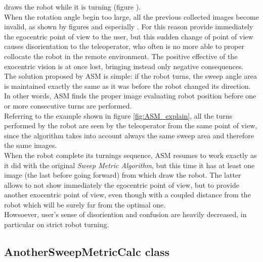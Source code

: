 \framework{} draws the robot while it is turning (figure
).
\\
When the rotation angle begin too large, all the previous collected images
become invalid, as shown by figures  and
especially . For this reason \framework{} provide
immediately the egocentric point of view to the user, but this sudden change
of point of view causes disorientation to the teleoperator, who often is
no more able to proper collocate the robot in the remote environment. The
positive effective of the exocentric vision is at once lost, bringing
instead only negative consequences.
\\
The solution proposed by ASM is simple: if the robot turns, the sweep angle
area is maintained exactly the same as it was before the robot changed
its direction. In other words, ASM finds the proper image evaluating robot
position before one or more consecutive turns are performed.
\\
Referring to the example shown in figure \ref{fig:ASM_explain}, all the
turns performed by the robot are seen by the teleoperator from the same
point of view, since the algorithm takes into account always the same
sweep area and therefore the same images.
\\
When the robot complete its turnings sequence, ASM resumes to
work exactly as it did with the original \textit{Sweep Metric Algorithm},
but this time it has at least one image (the last before going forward)
from which draw the robot. The latter allows \framework{} to not show
immediately the egocentric point of view, but to provide another exocentric
point of view, even though with a coupled distance from the robot which
will be surely far from the optimal one.
\\
Howsoever, user's sense of disoriention and confusion are heavily decreased,
in particular on strict robot turning.

\subsection{AnotherSweepMetricCalc class}
\label{concr:iimageselector:another_sweep_metric_class}

